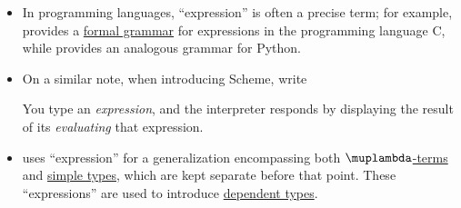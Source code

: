 \begin{comments}
\begin{itemize}
    \item In programming languages, \enquote{expression} is often a precise term; for example, \cite[\S 6.5]{ISO:9899:2018} provides a \hyperref[def:formal_grammar]{formal grammar} for expressions in the programming language C, while \cite{PythonDocs:3.13:expressions} provides an analogous grammar for Python.

    \item On a similar note, when introducing Scheme, \textcite[7]{AbelsonSussman2012eSICP} write
    \begin{displayquote}
      You type an \textit{expression}, and the interpreter responds by displaying the result of its \textit{evaluating} that expression.
    \end{displayquote}

    \item \Textcite[\S 8.1.1]{Mimram2020ProgramEqualsProof} uses \enquote{expression} for a generalization encompassing both \hyperref[def:lambda_term]{\( \muplambda \)-terms} and \hyperref[def:simple_type]{simple types}, which are kept separate before that point. These \enquote{expressions} are used to introduce \hyperref[con:dependent_type]{dependent types}.
  \end{itemize}
\end{comments}

